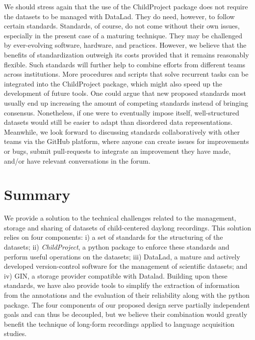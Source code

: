 \documentclass[smallextended]{svjour3}       %
\begin{document}
We should stress again that the use of the ChildProject package does not require the datasets to be managed with DataLad. They do need, however, to follow certain standards. Standards, of course, do not come without their own issues, especially in the present case of a maturing technique. They may be challenged by ever-evolving software, hardware, and practices. However, we believe that the benefits of standardization outweigh its costs provided that it remains reasonably flexible. Such standards will further help to combine efforts from different teams across institutions. More procedures and scripts that solve recurrent tasks can be integrated into the ChildProject package, which might also speed up the development of future tools. 
One could argue that new proposed standards most usually end up increasing the amount of competing standards instead of bringing consensus. Nonetheless, if one were to eventually impose itself, well-structured datasets would still be easier to adapt than disordered data representations. Meanwhile, we look forward to discussing standards collaboratively with other teams via the GitHub platform, where anyone can create issues for improvements or bugs, submit pull-requests to integrate an improvement they have made, and/or have relevant conversations in the forum.

\section{Summary}


We provide a solution to the technical challenges related to the management, storage and sharing of datasets of child-centered daylong recordings. This solution relies on four components: i) a set of standards for the structuring of the datasets; ii) \emph{ChildProject}, a python package to enforce these standards and perform useful operations on the datasets; iii) DataLad, a mature and actively developed version-control software for the management of scientific datasets; and iv) GIN, a storage provider compatible with Datalad. Building upon these standards, we have also provide tools to simplify the extraction of information from the annotations and the evaluation of their reliability along with the python package. The four components of our proposed design serve partially independent goals and can thus be decoupled, but we believe their combination would greatly benefit the technique of long-form recordings applied to language acquisition studies.
\end{document}
